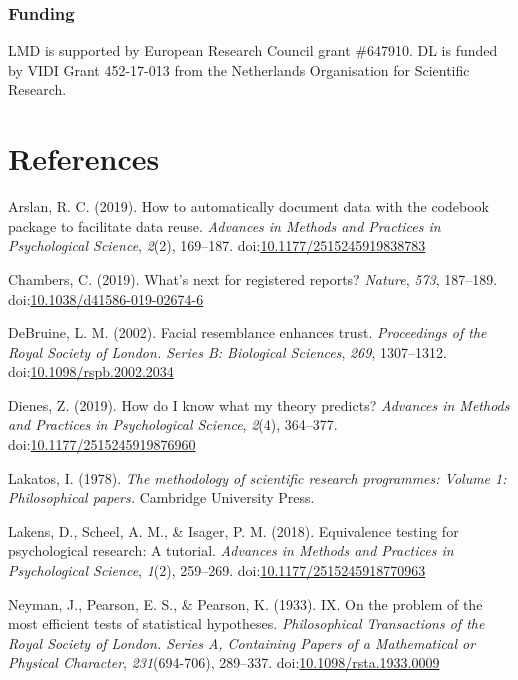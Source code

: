 \documentclass[doc,floatsintext]{apa6}
\begin{document}
\hypertarget{funding}{%
\subsubsection{Funding}\label{funding}}

LMD is supported by European Research Council grant \#647910. DL is funded by VIDI Grant 452-17-013 from the Netherlands Organisation for Scientific Research.

\newpage

\hypertarget{references}{%
\section{References}\label{references}}

\begingroup
\setlength{\parindent}{-0.5in}
\setlength{\leftskip}{0.5in}

\hypertarget{refs}{}
\leavevmode\hypertarget{ref-arslan2019}{}%
Arslan, R. C. (2019). How to automatically document data with the codebook package to facilitate data reuse. \emph{Advances in Methods and Practices in Psychological Science}, \emph{2}(2), 169--187. doi:\href{https://doi.org/10.1177/2515245919838783}{10.1177/2515245919838783}

\leavevmode\hypertarget{ref-chambers2019}{}%
Chambers, C. (2019). What's next for registered reports? \emph{Nature}, \emph{573}, 187--189. doi:\href{https://doi.org/10.1038/d41586-019-02674-6}{10.1038/d41586-019-02674-6}

\leavevmode\hypertarget{ref-debruine2002}{}%
DeBruine, L. M. (2002). Facial resemblance enhances trust. \emph{Proceedings of the Royal Society of London. Series B: Biological Sciences}, \emph{269}, 1307--1312. doi:\href{https://doi.org/10.1098/rspb.2002.2034}{10.1098/rspb.2002.2034}

\leavevmode\hypertarget{ref-dienes2019}{}%
Dienes, Z. (2019). How do I know what my theory predicts? \emph{Advances in Methods and Practices in Psychological Science}, \emph{2}(4), 364--377. doi:\href{https://doi.org/10.1177/2515245919876960}{10.1177/2515245919876960}

\leavevmode\hypertarget{ref-lakatos1978}{}%
Lakatos, I. (1978). \emph{The methodology of scientific research programmes: Volume 1: Philosophical papers.} Cambridge University Press.

\leavevmode\hypertarget{ref-lakens2018}{}%
Lakens, D., Scheel, A. M., \& Isager, P. M. (2018). Equivalence testing for psychological research: A tutorial. \emph{Advances in Methods and Practices in Psychological Science}, \emph{1}(2), 259--269. doi:\href{https://doi.org/10.1177/2515245918770963}{10.1177/2515245918770963}

\leavevmode\hypertarget{ref-neyman1933}{}%
Neyman, J., Pearson, E. S., \& Pearson, K. (1933). IX. On the problem of the most efficient tests of statistical hypotheses. \emph{Philosophical Transactions of the Royal Society of London. Series A, Containing Papers of a Mathematical or Physical Character}, \emph{231}(694-706), 289--337. doi:\href{https://doi.org/10.1098/rsta.1933.0009}{10.1098/rsta.1933.0009}

\endgroup
\end{document}
